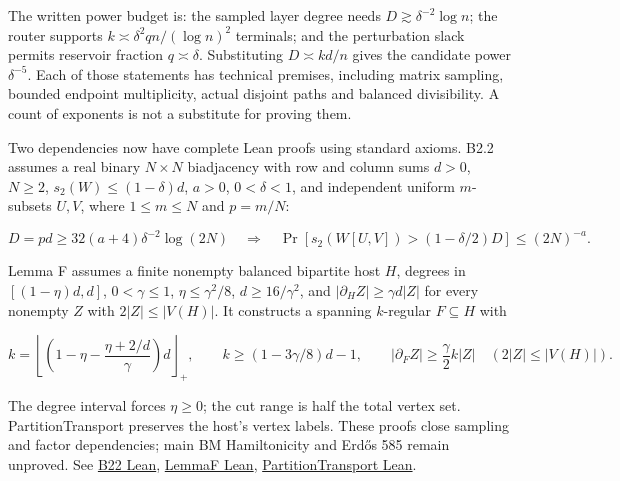 \documentclass[smallextended]{svjour3}
\newcounter{none} %
\begin{document}
The written power budget is: the sampled layer degree needs
\(D\gtrsim\delta^{-2}\log n\); the router supports
\(k\asymp\delta^2 qn/(\log n)^2\) terminals; and the perturbation slack
permits reservoir fraction \(q\asymp\delta\). Substituting
\(D\asymp kd/n\) gives the candidate power \(\delta^{-5}\). Each of
those statements has technical premises, including matrix sampling,
bounded endpoint multiplicity, actual disjoint paths and balanced
divisibility. A count of exponents is not a substitute for proving them.

Two dependencies now have complete Lean proofs using standard axioms.
B2.2 assumes a real binary \(N\times N\) biadjacency with row and column
sums \(d>0\), \(N\ge2\), \(s_2(W)\le(1-\delta)d\), \(a>0\),
\(0<\delta<1\), and independent uniform \(m\)-subsets \(U,V\), where
\(1\le m\le N\) and \(p=m/N\):

\[
D=pd\ge32(a+4)\delta^{-2}\log(2N)
\quad\Longrightarrow\quad
\Pr\!\left[s_2(W[U,V])>(1-\delta/2)D\right]\le(2N)^{-a}.
\]

Lemma F assumes a finite nonempty balanced bipartite host \(H\), degrees
in \([(1-\eta)d,d]\), \(0<\gamma\le1\), \(\eta\le\gamma^2/8\),
\(d\ge16/\gamma^2\), and \(|\partial_H Z|\ge\gamma d|Z|\) for every
nonempty \(Z\) with \(2|Z|\le|V(H)|\). It constructs a spanning
\(k\)-regular \(F\subseteq H\) with

\[
k=\left\lfloor\left(1-\eta-\frac{\eta+2/d}{\gamma}\right)d\right\rfloor_{+},
\qquad k\ge(1-3\gamma/8)d-1,
\qquad |\partial_F Z|\ge\frac\gamma2 k|Z|
\quad(2|Z|\le|V(H)|).
\]

The degree interval forces \(\eta\ge0\); the cut range is half the total
vertex set. PartitionTransport preserves the host's vertex labels. These
proofs close sampling and factor dependencies; main BM Hamiltonicity and
Erdős 585 remain unproved. See
\href{https://github.com/alejandrozu/openmath-2026-judging/blob/70c5ec3107658182f22c207d4c50f53f9cb3e602/robert-review-2026-10-07/lean/B22.lean\#L26}{B22
Lean},
\href{https://github.com/alejandrozu/openmath-2026-judging/blob/70c5ec3107658182f22c207d4c50f53f9cb3e602/robert-review-2026-10-07/lean/LemmaF.lean\#L18}{LemmaF
Lean},
\href{https://github.com/alejandrozu/openmath-2026-judging/blob/70c5ec3107658182f22c207d4c50f53f9cb3e602/robert-review-2026-10-07/lean/PartitionTransport.lean\#L54}{PartitionTransport
Lean}.
\end{document}
